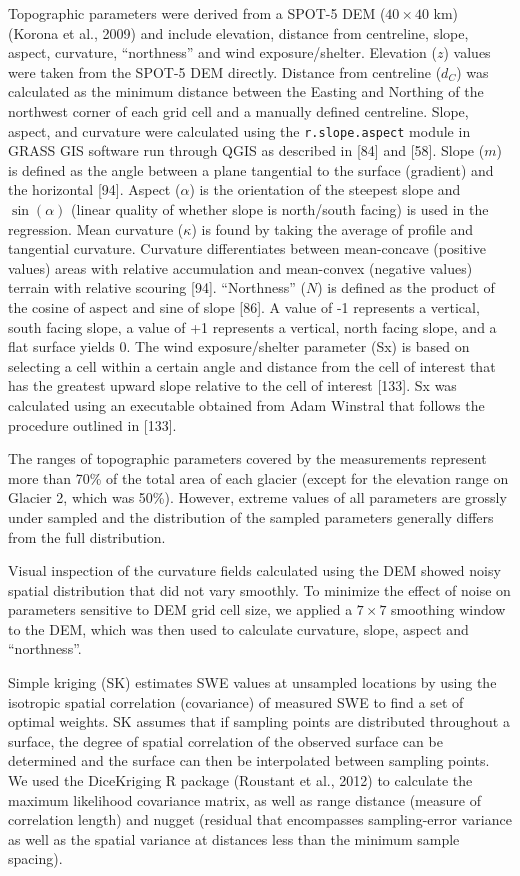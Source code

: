 \documentclass[twoside,twocolumn]{article}
\begin{document}
Topographic parameters were derived from a SPOT-5 DEM ($40\times40$ km) (Korona et al., 2009) and include elevation, distance from centreline, slope, aspect, curvature, ``northness'' and wind exposure/shelter. Elevation ($z$) values were taken from the SPOT-5 DEM directly. Distance from centreline ($d_C$) was calculated as the minimum distance between the Easting and Northing of the northwest corner of each grid cell and a manually defined centreline. Slope, aspect, and curvature were calculated using the \texttt{r.slope.aspect} module in GRASS GIS software run through QGIS as described in [84] and [58]. Slope ($m$) is defined as the angle between a plane tangential to the surface (gradient) and the horizontal [94]. Aspect ($\alpha$) is the orientation of the steepest slope and $\sin(\alpha)$ (linear quality of whether slope is north/south facing) is used in the regression. Mean curvature ($\kappa$) is found by taking the average of profile and tangential curvature. Curvature differentiates between mean-concave (positive values) areas with relative accumulation and mean-convex (negative values) terrain with relative scouring [94].   ``Northness'' ($N$) is defined as the product of the cosine of aspect and sine of slope [86]. A value of -1 represents a vertical, south facing slope, a value of +1 represents a vertical, north facing slope, and a flat surface yields 0. The wind exposure/shelter parameter (Sx) is based on selecting a cell within a certain angle and distance from the cell of interest that has the greatest upward slope relative to the cell of interest [133]. Sx was calculated using an executable obtained from Adam Winstral that follows the procedure outlined in [133]. 

The ranges of topographic parameters covered by the measurements represent more than 70\% of the total area of each glacier (except for the elevation range on Glacier 2, which was 50\%). However, extreme values of all parameters are grossly under sampled and the
distribution of the sampled parameters generally differs from the full distribution.

Visual inspection of the curvature fields calculated using the DEM showed noisy spatial
distribution that did not vary smoothly. To minimize the effect of noise on parameters sensitive to DEM grid cell size, we applied a $7\times7$ smoothing window to the DEM, which was then used to calculate curvature, slope, aspect and ``northness''.

Simple kriging (SK) estimates SWE values at unsampled locations by using the isotropic spatial correlation (covariance) of measured SWE to find a set of optimal weights. SK assumes that if sampling points are distributed throughout a surface, the degree of spatial correlation of the observed surface can be determined and the surface can then be interpolated between sampling points. We used the DiceKriging R package (Roustant et al., 2012) to calculate the maximum likelihood covariance matrix, as well as range distance (measure of correlation length) and nugget (residual that encompasses sampling-error variance as well as the spatial variance at distances less than the minimum sample spacing). 
\end{document}
